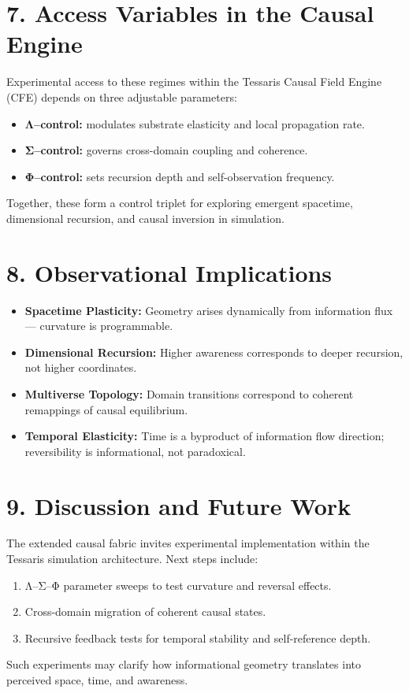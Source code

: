 \documentclass[11pt,a4paper]{article}
\begin{document}
\section{7. Access Variables in the Causal Engine}
Experimental access to these regimes within the Tessaris Causal Field Engine (CFE) depends on three adjustable parameters:
\begin{itemize}
  \item \textbf{Λ–control:} modulates substrate elasticity and local propagation rate.
  \item \textbf{Σ–control:} governs cross-domain coupling and coherence.
  \item \textbf{Φ–control:} sets recursion depth and self-observation frequency.
\end{itemize}
Together, these form a control triplet for exploring emergent spacetime, dimensional recursion, and causal inversion in simulation.

\section{8. Observational Implications}
\begin{itemize}
  \item \textbf{Spacetime Plasticity:} Geometry arises dynamically from information flux --- curvature is programmable.
  \item \textbf{Dimensional Recursion:} Higher awareness corresponds to deeper recursion, not higher coordinates.
  \item \textbf{Multiverse Topology:} Domain transitions correspond to coherent remappings of causal equilibrium.
  \item \textbf{Temporal Elasticity:} Time is a byproduct of information flow direction; reversibility is informational, not paradoxical.
\end{itemize}

\section{9. Discussion and Future Work}
The extended causal fabric invites experimental implementation within the Tessaris simulation architecture.  
Next steps include:
\begin{enumerate}
  \item Λ–Σ–Φ parameter sweeps to test curvature and reversal effects.
  \item Cross-domain migration of coherent causal states.
  \item Recursive feedback tests for temporal stability and self-reference depth.
\end{enumerate}
Such experiments may clarify how informational geometry translates into perceived space, time, and awareness.
\end{document}

